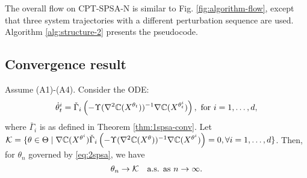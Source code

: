 The overall flow on CPT-SPSA-N is similar to Fig. \ref{fig:algorithm-flow}, except that three system trajectories with a different perturbation sequence are used. Algorithm \ref{alg:structure-2} presents the pseudocode.  

\subsection{Convergence result}
\begin{theorem}
\label{thm:2spsa}
Assume (A1)-(A4). 
Consider the ODE: 
$$
\dot\theta^{i}_t = \check\Gamma_{i}\left( - \Upsilon(\nabla^2 \mathbb{C}(X^{\theta_t}))^{-1} \nabla \mathbb{C}(X^{\theta^{i}_t}) \right), \text { for }i=1,\dots,d,$$
where 
$\bar\Gamma_{i}$ is as defined in Theorem \ref{thm:1spsa-conv}. Let $\mathcal{K} = \{\theta \in \Theta \mid
\nabla \mathbb{C}(X^{\theta^{i}})  \check\Gamma_{i}\left(-\Upsilon(\nabla^2 \mathbb{C}(X^{\theta}))^{-1} \nabla \mathbb{C}(X^{\theta^{i}})\right)
=0, \forall i=1,\ldots,d\}$. Then, for $\theta_n$ governed by \eqref{eq:2spsa}, 
we have
$$\theta_n \rightarrow \mathcal{K}  \text{~~ a.s. as } n\rightarrow \infty.$$ 
\end{theorem}
